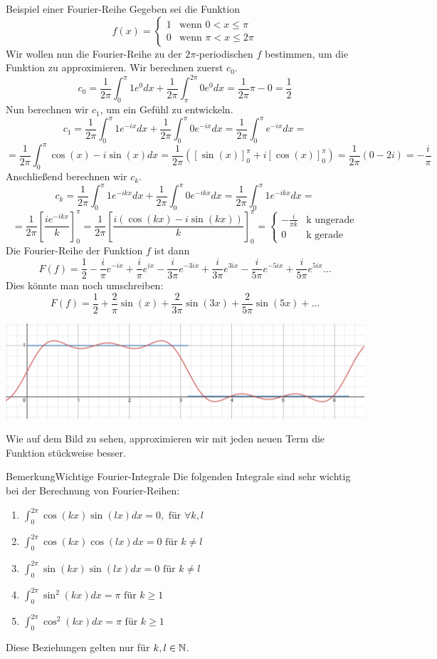 \begin{Beispiel}{Beispiel einer Fourier-Reihe}
Gegeben sei die Funktion $$f(x)=\begin{cases}1 & \mbox{wenn $0< x\leq \pi$}\\
0 & \mbox{wenn $\pi< x\leq 2\pi$}
\end{cases}$$
Wir wollen nun die Fourier-Reihe zu der $2\pi$-periodischen $f$ bestimmen, um die Funktion zu approximieren. Wir berechnen zuerst $c_0$.
$$c_0=\frac{1}{2\pi}\int_0^\pi 1 e^{0} dx + \frac{1}{2\pi}\int_\pi^{2\pi} 0 e^{0} dx = \frac{1}{2\pi}\pi - 0 = \frac{1}{2}$$
Nun berechnen wir $c_1$, um ein Gefühl zu entwickeln.
$$c_1=\frac{1}{2\pi}\int_0^\pi 1 e^{-ix}dx + \frac{1}{2\pi}\int_0^\pi 0 e^{-ix}dx = \frac{1}{2\pi}\int_0^\pi  e^{-ix}dx = $$
$$=\frac{1}{2\pi} \int_0^\pi \cos(x) - i\sin(x) dx =\frac{1}{2\pi}([\sin(x)]^\pi_0+i[\cos(x)]^\pi_0)=\frac{1}{2\pi}(0-2i)=-\frac{i}{\pi}$$
Anschließend berechnen wir $c_k$.
$$c_k=\frac{1}{2\pi}\int_0^\pi 1 e^{-ikx}dx + \frac{1}{2\pi}\int_0^\pi 0 e^{-ikx}dx=\frac{1}{2\pi}\int_0^\pi 1 e^{-ikx}dx=$$
$$=\frac{1}{2\pi} [\frac{ie^{-ikx}}{k}]_0^{\pi}=\frac{1}{2\pi} [\frac{i(\cos(kx)-i\sin(kx))}{k}]_0^\pi=\begin{cases}-\frac{i}{\pi k} & \mbox{k ungerade}\\ 0 & \mbox{k gerade}\end{cases}$$
Die Fourier-Reihe der Funktion $f$ ist dann
$$F(f)=\frac{1}{2}-\frac{i}{\pi}e^{-ix}+\frac{i}{\pi}e^{ix}-\frac{i}{3\pi}e^{-3ix}+\frac{i}{3\pi}e^{3ix}-\frac{i}{5\pi}e^{-5ix}+\frac{i}{5\pi}e^{5ix}\dots$$
Dies könnte man noch umschreiben:
$$F(f)=\frac{1}{2}+\frac{2}{\pi}\sin(x)+\frac{2}{3\pi}\sin(3x)+\frac{2}{5\pi}\sin(5x)+\dots$$
\begin{center}
    \includegraphics[width=.8\textwidth]{Dateien/Fourier_Beispiel.png}
\end{center}
Wie auf dem Bild zu sehen, approximieren wir mit jeden neuen Term die Funktion stückweise besser.

\end{Beispiel}
\begin{Satz}{Bemerkung}{Wichtige Fourier-Integrale}
Die folgenden Integrale sind sehr wichtig bei der Berechnung von Fourier-Reihen:
\begin{enumerate}
    \item $\int_0^{2\pi} \cos(kx)\sin(lx)dx=0, \mbox{ für $\forall k,l$}$
    \item $\int_0^{2\pi}\cos(kx)\cos(lx)dx=0 \mbox{ für $k\neq l$}$
    \item $\int_0^{2\pi}\sin(kx)\sin(lx)dx=0 \mbox{ für $k\neq l$}$
    \item $\int_0^{2\pi}\sin^2(kx)dx=\pi \mbox{ für $k\geq 1$}$
    \item $\int_0^{2\pi}\cos^2(kx)dx=\pi \mbox{ für $k\geq 1$}$
\end{enumerate}
 Diese Beziehungen gelten nur für $k,l\in\mathbb{N}$.
\end{Satz}
